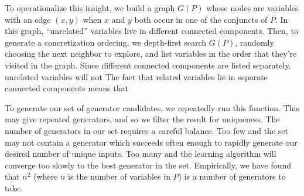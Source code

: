 \documentclass[sigconf,nonacm,review,anonymous]{acmart}
\begin{document}
To operationalize this insight, we build a graph $G(P)$ whose nodes are variables
with an edge $(x,y)$ when $x$ and $y$ both occur in one of the conjuncts of $P$. In
this graph, ``unrelated'' variables live in different connected components.
Then, to generate a concretization ordering, we depth-first search $G(P)$, randomly
choosing the next neighbor to explore,
and list variables in the order that they're visited in the graph.
Since different connected components are listed separately, unrelated variables
will not 
The fact that related variables lie in separate connected components means
that 


      

      
      

To generate our set of generator candidates, we repeatedly run this function.
This may give repeated generators, and so we filter the result for uniqueness.
The number of generators in our set requires a careful
balance. Too few and the set may not contain a generator which succeeds often
enough to rapidly generate our desired number of unique inputs. Too many and the
learning algorithm will converge too slowly to the best generator in the set.
Empirically, we have found that $n^2$ (where $n$ is the number of variables in
$P$) is a number of generators to take.
\end{document}
